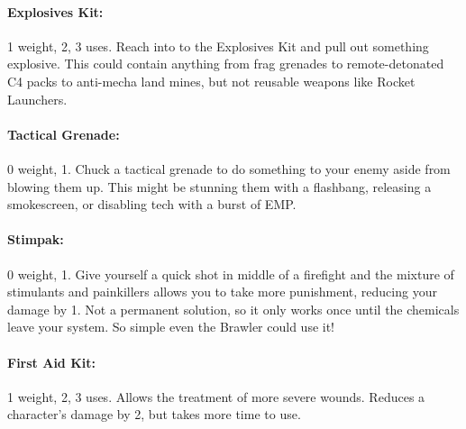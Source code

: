 \paragraph{Explosives Kit:} 1 weight, 2\money, 3 uses. Reach into to the Explosives Kit and pull out something explosive. This could contain anything from frag grenades to remote-detonated C4 packs to anti-mecha land mines, but not reusable weapons like Rocket Launchers.
\paragraph{Tactical Grenade:} 0 weight, 1\money. Chuck a tactical grenade to do something to your enemy aside from blowing them up. This might be stunning them with a flashbang, releasing a smokescreen, or disabling tech with a burst of EMP.
\paragraph{Stimpak:} 0 weight, 1\money. Give yourself a quick shot in middle of a firefight and the mixture of stimulants and painkillers allows you to take more punishment, reducing your damage by 1. Not a permanent solution, so it only works once until the chemicals leave your system. So simple even the Brawler could use it!
\paragraph{First Aid Kit:} 1 weight, 2\money, 3 uses. Allows the treatment of more severe wounds. Reduces a character's damage by 2, but takes more time to use.

